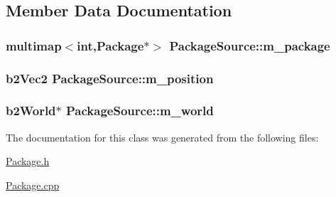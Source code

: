\subsection{Member Data Documentation}
\hypertarget{classPackageSource_aa0455215e114d375fd35c97de281554a}{
\subsubsection[{m\-\_\-package}]{\setlength{\rightskip}{0pt plus 5cm}multimap$<$int,{\bf Package}$\ast$$>$ Package\-Source\-::m\-\_\-package}}\label{classPackageSource_aa0455215e114d375fd35c97de281554a}
\hypertarget{classPackageSource_a22e0dbb7f2075fc30620ad227bd8d4b7}{
\subsubsection[{m\-\_\-position}]{\setlength{\rightskip}{0pt plus 5cm}b2\-Vec2 Package\-Source\-::m\-\_\-position}}\label{classPackageSource_a22e0dbb7f2075fc30620ad227bd8d4b7}
\hypertarget{classPackageSource_a2a5fbbce39f0c58b781edf42d9a46e54}{
\subsubsection[{m\-\_\-world}]{\setlength{\rightskip}{0pt plus 5cm}b2\-World$\ast$ Package\-Source\-::m\-\_\-world}}\label{classPackageSource_a2a5fbbce39f0c58b781edf42d9a46e54}


The documentation for this class was generated from the following files\-:\begin{DoxyCompactItemize}
\item 
\hyperlink{Package_8h}{Package.\-h}\item 
\hyperlink{Package_8cpp}{Package.\-cpp}\end{DoxyCompactItemize}
